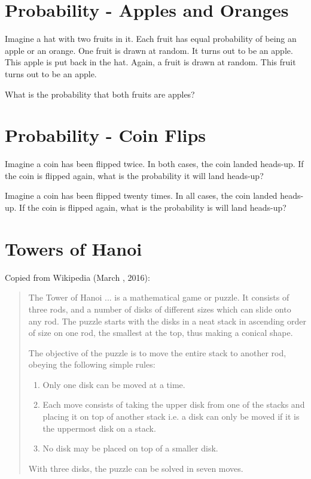 \documentclass[letterpaper, 11pt]{report}
\numberwithin{equation}{section}
\begin{document}
			
		\section{Probability - Apples and Oranges}
			
			
			Imagine a hat with two fruits in it.
			Each fruit has equal probability of being an apple or an orange.
			One fruit is drawn at random.
			It turns out to be an apple.
			This apple is put back in the hat.
			Again, a fruit is drawn at random.
			This fruit turns out to be an apple.
			
			What is the probability that both fruits are apples?
			
			
		\section{Probability - Coin Flips}
			
			
			Imagine a coin has been flipped twice.
			In both cases, the coin landed heads-up.
			If the coin is flipped again, what is the probability it will land heads-up?
			
			Imagine a coin has been flipped twenty times.
			In all cases, the coin landed heads-up.
			If the coin is flipped again, what is the probability is will land heads-up?
			
			
		\section{Towers of Hanoi}
			
			
			Copied from Wikipedia (March , 2016):
			\begin{quote}
				The Tower of Hanoi ... is a mathematical game or puzzle. It consists of three rods, and a number of disks of different sizes which can slide onto any rod. The puzzle starts with the disks in a neat stack in ascending order of size on one rod, the smallest at the top, thus making a conical shape.
				
				The objective of the puzzle is to move the entire stack to another rod, obeying the following simple rules:
				\begin{enumerate}
					\item Only one disk can be moved at a time.
					\item Each move consists of taking the upper disk from one of the stacks and placing it on top of another stack i.e. a disk can only be moved if it is the uppermost disk on a stack.
					\item No disk may be placed on top of a smaller disk.
				\end{enumerate}
				With three disks, the puzzle can be solved in seven moves.
			\end{quote}
			
\end{document}
